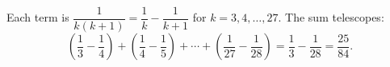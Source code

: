 Each term is $\dfrac{1}{k(k+1)}=\dfrac{1}{k}-\dfrac{1}{k+1}$ for $k=3,4,\dots,27$. The sum telescopes:
\[
\left(\dfrac{1}{3}-\dfrac{1}{4}\right)+\left(\dfrac{1}{4}-\dfrac{1}{5}\right)+\cdots+\left(\dfrac{1}{27}-\dfrac{1}{28}\right)=\dfrac{1}{3}-\dfrac{1}{28}=\boxed{\dfrac{25}{84}}.
\]
